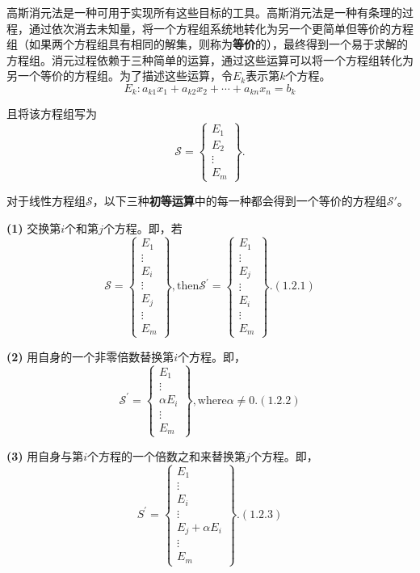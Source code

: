 高斯消元法是一种可用于实现所有这些目标的工具。高斯消元法是一种有条理的过程，通过依次消去未知量，将一个方程组系统地转化为另一个更简单但等价的方程组（如果两个方程组具有相同的解集，则称为\textbf{等价}的），最终得到一个易于求解的方程组。消元过程依赖于三种简单的运算，通过这些运算可以将一个方程组转化为另一个等价的方程组。为了描述这些运算，令\( E_k \)表示第\( k \)个方程。
\[E_k:a_{k1}x_1+a_{k2}x_2+\cdots+a_{kn}x_n=b_k\]

且将该方程组写为
\[\mathcal{S}=\begin{Bmatrix}E_{1}\\E_{2}\\\vdots\\E_{m}\end{Bmatrix}.\]

对于线性方程组\( \mathcal{S} \)，以下三种\textbf{初等运算}中的每一种都会得到一个等价的方程组\( \mathcal{S}' \)。

\textbf{(1)} 交换第\( i \)个和第\( j \)个方程。即，若
\[\mathcal{S}=\begin{Bmatrix}E_{1}\\\vdots\\E_{i}\\\vdots\\E_{j}\\\vdots\\E_{m}\end{Bmatrix}, \mathrm{then} \mathcal{S}^{\prime}=\begin{Bmatrix}E_{1}\\\vdots\\E_{j}\\\vdots\\E_{i}\\\vdots\\E_{m}\end{Bmatrix}. (1.2.1)\]

\textbf{(2)} 用自身的一个非零倍数替换第\( i \)个方程。即，
\[\left.\mathcal{S}^{\prime}=\left\{\begin{array}{c}E_1\\\vdots\\\alpha E_i\\\vdots\\E_m\end{array}\right.\right\}, \mathrm{where} \alpha\neq0. (1.2.2)\]

\textbf{(3)} 用自身与第\( i \)个方程的一个倍数之和来替换第\( j \)个方程。即，
\[\left.S^{\prime}=\left\{\begin{array}{c}E_1\\\vdots\\E_i\\\vdots\\E_j+\alpha E_i\\\vdots\\E_m\end{array}\right.\right\}.(1.2.3)\]

